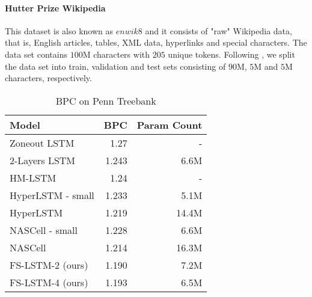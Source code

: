 \documentclass{article}
\begin{document}
\paragraph{Hutter Prize Wikipedia \cite{hutter2012enwik8}}  This dataset is also known as $enwik8$ and it consists of "raw" Wikipedia data, that is, English articles, tables, XML data, hyperlinks and special characters. The data set contains $100$M characters with $205$ unique tokens. 
Following \cite{chung2015gated}, we split the data set into train, validation and test sets consisting of $ 90$M, $5$M and $5$M characters, respectively.































\begin{table}
\caption{BPC  on Penn Treebank}
\label{table: ptb}
\renewcommand{\arraystretch}{1.1}
\begin{center}
 \begin{tabular}{@{}l r r@{}}
\toprule[1.5pt]
Model & BPC & Param Count \\ 
\midrule
Zoneout LSTM \cite{krueger16zoneout}& 1.27 & -\\
2-Layers LSTM & 1.243 & 6.6M\\
 HM-LSTM \cite{chung2016multiscale}& 1.24 & - \\
 HyperLSTM - small \cite{ha2016hyper}& 1.233 & 5.1M \\
 HyperLSTM \cite{ha2016hyper} & 1.219 & 14.4M \\  
 NASCell - small \cite{zoph2016NASCell} & 1.228 & 6.6M \\
 NASCell \cite{zoph2016NASCell} & 1.214 & 16.3M \\
 \midrule
 FS-LSTM-2 (ours) & 1.190 & 7.2M \\ 
 FS-LSTM-4 (ours) & 1.193 & 6.5M \\
 \bottomrule[1.5pt]
\end{tabular}
\end{center}
\end{table}
\end{document}
